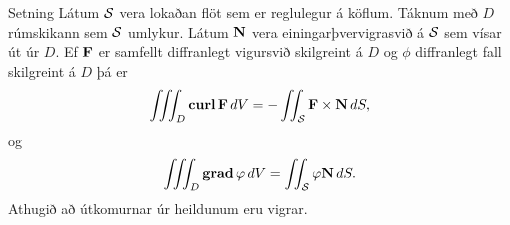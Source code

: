 \begin{frame}{} 

\begin {block}{Setning \rtask{}}
Látum $\cal S$ vera lokaðan flöt sem er reglulegur á köflum.  Táknum með $D$ rúmskikann sem $\cal S$ umlykur.  Látum $\mbox{${\bf N}$}$ vera einingarþvervigrasvið á $\cal S$   sem vísar út úr $D$.  Ef $\mbox{${\bf F}$}$ er samfellt diffranlegt vigursvið skilgreint á $D$ og $\phi$ diffranlegt fall skilgreint á $D$ þá er
$$\thrint_D\curl \Fv\,dV=-\tvint_{\cal S}\Fv\times\Nv\,dS,$$
og 
$$\thrint_D\grad\phi\,dV=\tvint_{\cal S}\phi\Nv\,dS.$$
Athugið að útkomurnar úr heildunum eru vigrar.
\end{block}

\end{frame}


